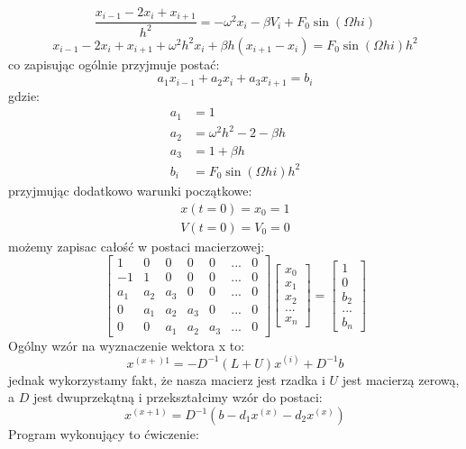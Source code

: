 \documentclass[12pt,a4paper]{article}
\begin{document}
\begin{enumerate}
\begin{equation}
\dfrac{x_{i-1}-2x_i+x_{i+1}}{h^2}=-\omega^2x_i-\beta V_i+F_0\sin(\Omega hi)
\end{equation}
\begin{equation}
x_{i-1}-2x_i+x_{i+1}+\omega^2h^2x_i+\beta h(x_{i+1}-x_i)=F_0\sin(\Omega hi)h^2
\end{equation}
co zapisując ogólnie przyjmuje postać:
\begin{equation}
a_1x_{i-1}+a_2x_i+a_3x_{i+1}=b_i
\end{equation}
gdzie:
\begin{align}
\nonumber a_1&=1\\
\nonumber a_2&=\omega^2h^2-2-\beta h\\
\nonumber a_3&=1+\beta h\\
\nonumber b_i&=F_0\sin(\Omega hi)h^2
\end{align}
przyjmując dodatkowo warunki początkowe:
\begin{align}
\nonumber x(t=0)=x_0=1\\
\nonumber V(t=0)=V_0=0
\end{align}
możemy zapisac całość w postaci macierzowej:
\begin{equation}
\begin{bmatrix}
1&0&0&0&0&...&0\\
-1&1&0&0&0&...&0\\
a_1&a_2&a_3&0&0&...&0\\
0&a_1&a_2&a_3&0&...&0\\
0&0&a_1&a_2&a_3&...&0
\end{bmatrix}
\begin{bmatrix}
x_0\\x_1\\x_2\\...\\x_n
\end{bmatrix}=
\begin{bmatrix}
1\\0\\b_2\\...\\b_n
\end{bmatrix}
\end{equation}
Ogólny wzór na wyznaczenie wektora x to:\\
$$x^{(x+)1}=-D^{-1}(L+U)x^{(i)}+D^{-1}b$$
jednak wykorzystamy fakt, że nasza macierz jest rzadka i $U$ jest macierzą zerową, a $D$ jest dwuprzekątną i przekształcimy wzór do postaci:
$$x^{(x+1)}=D^{-1}\left(b-d_1x^{(x)}-d_2x^{(x)}\right)$$
Program wykonujący to ćwiczenie:\\

\end{enumerate}
\end{document}
